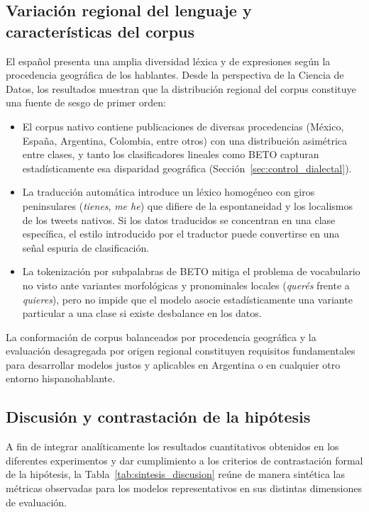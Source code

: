 \documentclass[12pt,a4paper]{article}
\begin{document}
\subsection{Variación regional del lenguaje y características del corpus}
\label{sec:variacion_dialectal}
El español presenta una amplia diversidad léxica y de expresiones según la procedencia geográfica de los hablantes. Desde la perspectiva de la Ciencia de Datos, los resultados muestran que la distribución regional del corpus constituye una fuente de sesgo de primer orden:
\begin{itemize}[leftmargin=2em]
    \item El corpus nativo contiene publicaciones de diversas procedencias (México, España, Argentina, Colombia, entre otros) con una distribución asimétrica entre clases, y tanto los clasificadores lineales como BETO capturan estadísticamente esa disparidad geográfica (Sección~\ref{sec:control_dialectal}).
    \item La traducción automática introduce un léxico homogéneo con giros peninsulares (\emph{tienes}, \emph{me he}) que difiere de la espontaneidad y los localismos de los tweets nativos. Si los datos traducidos se concentran en una clase específica, el estilo introducido por el traductor puede convertirse en una señal espuria de clasificación.
    \item La tokenización por subpalabras de BETO mitiga el problema de vocabulario no visto ante variantes morfológicas y pronominales locales (\emph{querés} frente a \emph{quieres}), pero no impide que el modelo asocie estadísticamente una variante particular a una clase si existe desbalance en los datos.
\end{itemize}
La conformación de corpus balanceados por procedencia geográfica y la evaluación desagregada por origen regional constituyen requisitos fundamentales para desarrollar modelos justos y aplicables en Argentina o en cualquier otro entorno hispanohablante.

\subsection{Discusión y contrastación de la hipótesis}
\label{sec:discusion}
A fin de integrar analíticamente los resultados cuantitativos obtenidos en los diferentes experimentos y dar cumplimiento a los criterios de contrastación formal de la hipótesis, la Tabla~\ref{tab:sintesis_discusion} reúne de manera sintética las métricas observadas para los modelos representativos en sus distintas dimensiones de evaluación.
\end{document}
